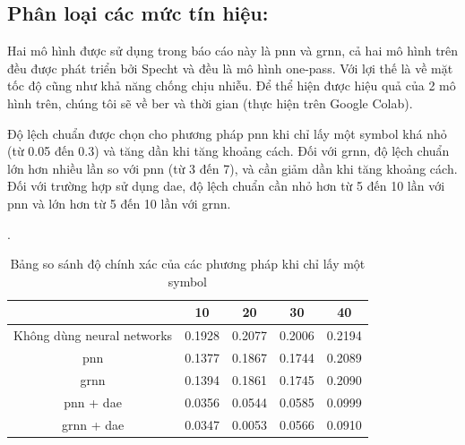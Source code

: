 \subsection{Phân loại các mức tín hiệu:}

Hai mô hình được sử dụng trong báo cáo này là \ac{pnn} và \ac{grnn}, cả hai mô hình trên đều được phát triển bởi Specht và đều là mô hình one-pass. Với lợi thế là về mặt tốc độ cũng như khả năng chống chịu nhiễu. Để thể hiện được hiệu quả của 2 mô hình trên, chúng tôi sẽ về \ac{ber} và thời gian (thực hiện trên Google Colab).

Độ lệch chuẩn được chọn cho phương pháp \ac{pnn} khi chỉ lấy một symbol khá nhỏ (từ 0.05 đến 0.3) và tăng dần khi tăng khoảng cách. Đối với \ac{grnn}, độ lệch chuẩn lớn hơn nhiều lần so với \ac{pnn} (từ 3 đến 7), và cần giảm dần khi tăng khoảng cách. Đối với trường hợp sử dụng \ac{dae}, độ lệch chuẩn cần nhỏ hơn từ 5 đến 10 lần với \ac{pnn} và lớn hơn từ 5 đến 10 lần với \ac{grnn}.

\begin{table}[ht]
	\caption{Bảng so sánh độ chính xác của các phương pháp khi chỉ lấy một symbol}.
	\begin{center}
	\small
		\begin{tabular}{|c|c|c|c|c|}
			\hline 
			\backslashbox{Phương pháp}{Khoảng cách(cm) } & 10& 20 & 30 & 40\\
			\hline
			Không dùng neural networks & 0.1928 & 0.2077 & 0.2006 & 0.2194\\
			\hline 
			\ac{pnn} & 0.1377 & 0.1867 & 0.1744 & 0.2089\\
			\hline
			\ac{grnn} & 0.1394 & 0.1861 & 0.1745 & 0.2090\\
			\hline
			\ac{pnn} + \ac{dae} & 0.0356 & 0.0544 & 0.0585 & 0.0999\\
			\hline
			\ac{grnn} + \ac{dae} & 0.0347 & 0.0053 & 0.0566 & 0.0910\\
			\hline
		\end{tabular}
		\label{tab:result_1}
	\end{center}
\end{table}

